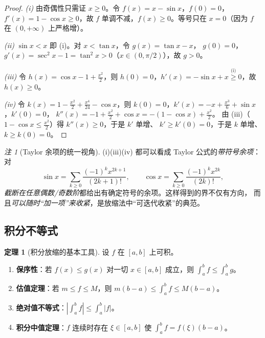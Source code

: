 \documentclass[11pt,a4paper]{ctexart}
\theoremstyle{definition}
\newtheorem{theorem}{定理}[section]
\theoremstyle{remark}
\newtheorem*{remark}{注}
\newcommand{\abs}[1]{\left\lvert #1 \right\rvert}
\begin{document}
\begin{proof}
\emph{(i)} 由奇偶性只需证 $x\ge0$。令 $f(x)=x-\sin x$，$f(0)=0$，
$f'(x)=1-\cos x\ge0$，故 $f$ 单调不减，$f(x)\ge0$。等号只在 $x=0$（因为
$f$ 在 $(0,+\infty)$ 上严格增）。

\emph{(ii)} $\sin x<x$ 即 (i)。对 $x<\tan x$，令 $g(x)=\tan x-x$，
$g(0)=0$，$g'(x)=\sec^2x-1=\tan^2x>0$（$x\in(0,\pi/2)$），故 $g>0$。

\emph{(iii)} 令 $h(x)=\cos x-1+\frac{x^2}{2}$，则
$h(0)=0$，$h'(x)=-\sin x+x\overset{\text{(i)}}{\ge}0$，故 $h(x)\ge0$。

\emph{(iv)} 令 $k(x)=1-\frac{x^2}{2}+\frac{x^4}{24}-\cos x$，则
$k(0)=0$，$k'(x)=-x+\frac{x^3}{6}+\sin x$，$k'(0)=0$，
$k''(x)=-1+\frac{x^{2}}{2}+\cos x=-(1-\cos x)+\frac{x^2}{2}$。
由 (iii)（$1-\cos x\le\frac{x^2}{2}$）得 $k''(x)\ge0$，于是 $k'$ 单增、
$k'\ge k'(0)=0$，于是 $k$ 单增、$k\ge k(0)=0$。
\end{proof}

\begin{remark}[Taylor 余项的统一视角]
(i)(iii)(iv) 都可以看成 Taylor 公式的\emph{带符号余项}：对
\[
  \sin x=\sum_{k\ge0}\frac{(-1)^{k}x^{2k+1}}{(2k+1)!},
  \qquad
  \cos x=\sum_{k\ge0}\frac{(-1)^{k}x^{2k}}{(2k)!},
\]
\emph{截断在任意偶数/奇数阶}都给出有确定符号的余项。这样得到的界不仅有方向，
而且\emph{可以随时“加一项”来收紧}，是放缩法中“可迭代收紧”的典范。
\end{remark}

\subsection{积分不等式}

\begin{theorem}[积分放缩的基本工具]\label{thm:integral}
设 $f$ 在 $[a,b]$ 上可积。
\begin{enumerate}[label=(\roman*)]
  \item \textbf{保序性}：若 $f(x)\le g(x)$ 对一切 $x\in[a,b]$ 成立，则
        $\displaystyle\int_a^b f\le\int_a^b g$。
  \item \textbf{估值定理}：若 $m\le f\le M$，则
        $\displaystyle m(b-a)\le\int_a^b f\le M(b-a)$。
  \item \textbf{绝对值不等式}：$\displaystyle\abs{\int_a^b f}\le\int_a^b\abs f$。
  \item \textbf{积分中值定理}：$f$ 连续时存在 $\xi\in[a,b]$ 使
        $\displaystyle\int_a^b f=f(\xi)(b-a)$。
\end{enumerate}
\end{theorem}
\end{document}
